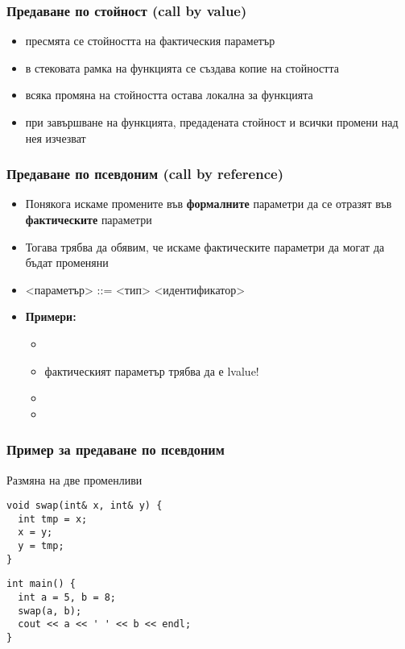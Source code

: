 \documentclass{beamer}
\begin{document}
\begin{frame}
  \frametitle{Предаване по стойност (call by value)}

  \begin{itemize}[<+->]
  \item пресмята се стойността на фактическия параметър
  \item в стековата рамка на функцията се създава \alert{копие} на стойността
  \item всяка промяна на стойността остава локална за функцията
  \item при завършване на функцията, предадената стойност и всички промени над нея \alert{изчезват}
  \end{itemize}
\end{frame}

\begin{frame}
  \frametitle{Предаване по псевдоним (call by reference)}

  \begin{itemize}[<+->]
  \item Понякога искаме промените във \textbf{формалните} параметри
    да се отразят във \textbf{фактическите} параметри
  \item Тогава трябва да обявим, че искаме фактическите параметри да могат да бъдат променяни
  \item{} <параметър> ::= <тип>\tta{\&} <идентификатор>
  \item \textbf{Примери:}
    \begin{itemize}
    \item {}
    \item \alert{фактическият параметър трябва да е lvalue!}
    \item {}
    \item {}
    \end{itemize}
  \end{itemize}
\end{frame}

\begin{frame}[fragile]
  \frametitle{Пример за предаване по псевдоним}

  Размяна на две променливи
\begin{lstlisting}
void swap(int& x, int& y) {
  int tmp = x;
  x = y;
  y = tmp;
}
\end{lstlisting}
\pause
\begin{lstlisting}
int main() {
  int a = 5, b = 8;
  swap(a, b);
  cout << a << ' ' << b << endl;
}
\end{lstlisting}
\end{frame}
\end{document}
